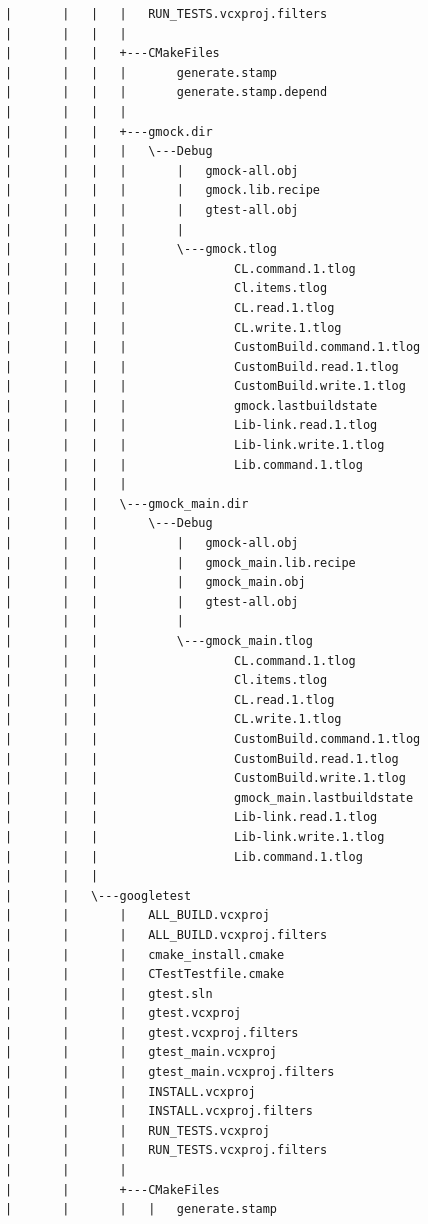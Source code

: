 \documentclass[12pt,a4paper]{article}
\begin{document}
\begin{verbatim}
|       |   |   |   RUN_TESTS.vcxproj.filters
|       |   |   |   
|       |   |   +---CMakeFiles
|       |   |   |       generate.stamp
|       |   |   |       generate.stamp.depend
|       |   |   |       
|       |   |   +---gmock.dir
|       |   |   |   \---Debug
|       |   |   |       |   gmock-all.obj
|       |   |   |       |   gmock.lib.recipe
|       |   |   |       |   gtest-all.obj
|       |   |   |       |   
|       |   |   |       \---gmock.tlog
|       |   |   |               CL.command.1.tlog
|       |   |   |               Cl.items.tlog
|       |   |   |               CL.read.1.tlog
|       |   |   |               CL.write.1.tlog
|       |   |   |               CustomBuild.command.1.tlog
|       |   |   |               CustomBuild.read.1.tlog
|       |   |   |               CustomBuild.write.1.tlog
|       |   |   |               gmock.lastbuildstate
|       |   |   |               Lib-link.read.1.tlog
|       |   |   |               Lib-link.write.1.tlog
|       |   |   |               Lib.command.1.tlog
|       |   |   |               
|       |   |   \---gmock_main.dir
|       |   |       \---Debug
|       |   |           |   gmock-all.obj
|       |   |           |   gmock_main.lib.recipe
|       |   |           |   gmock_main.obj
|       |   |           |   gtest-all.obj
|       |   |           |   
|       |   |           \---gmock_main.tlog
|       |   |                   CL.command.1.tlog
|       |   |                   Cl.items.tlog
|       |   |                   CL.read.1.tlog
|       |   |                   CL.write.1.tlog
|       |   |                   CustomBuild.command.1.tlog
|       |   |                   CustomBuild.read.1.tlog
|       |   |                   CustomBuild.write.1.tlog
|       |   |                   gmock_main.lastbuildstate
|       |   |                   Lib-link.read.1.tlog
|       |   |                   Lib-link.write.1.tlog
|       |   |                   Lib.command.1.tlog
|       |   |                   
|       |   \---googletest
|       |       |   ALL_BUILD.vcxproj
|       |       |   ALL_BUILD.vcxproj.filters
|       |       |   cmake_install.cmake
|       |       |   CTestTestfile.cmake
|       |       |   gtest.sln
|       |       |   gtest.vcxproj
|       |       |   gtest.vcxproj.filters
|       |       |   gtest_main.vcxproj
|       |       |   gtest_main.vcxproj.filters
|       |       |   INSTALL.vcxproj
|       |       |   INSTALL.vcxproj.filters
|       |       |   RUN_TESTS.vcxproj
|       |       |   RUN_TESTS.vcxproj.filters
|       |       |   
|       |       +---CMakeFiles
|       |       |   |   generate.stamp

\end{verbatim}
\end{document}
